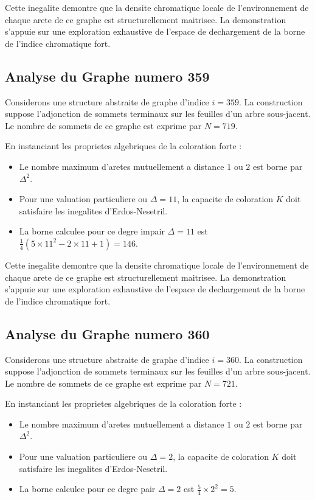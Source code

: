 \documentclass[11pt,a4paper]{article}
\begin{document}
Cette inegalite demontre que la densite chromatique locale de l'environnement de chaque arete de ce graphe est structurellement maitrisee. La demonstration s'appuie sur une exploration exhaustive de l'espace de dechargement de la borne de l'indice chromatique fort.

\subsection{Analyse du Graphe numero 359}
Considerons une structure abstraite de graphe d'indice $i = 359$. La construction suppose l'adjonction de sommets terminaux sur les feuilles d'un arbre sous-jacent. Le nombre de sommets de ce graphe est exprime par $N = 719$.

En instanciant les proprietes algebriques de la coloration forte :
\begin{itemize}
\item Le nombre maximum d'aretes mutuellement a distance $1$ ou $2$ est borne par $\Delta^2$.
\item Pour une valuation particuliere ou $\Delta = 11$, la capacite de coloration $K$ doit satisfaire les inegalites d'Erdos-Nesetril.
\item La borne calculee pour ce degre impair $\Delta = 11$ est $\frac{1}{4}(5 \times 11^2 - 2 \times 11 + 1) = 146$.
\end{itemize}

Cette inegalite demontre que la densite chromatique locale de l'environnement de chaque arete de ce graphe est structurellement maitrisee. La demonstration s'appuie sur une exploration exhaustive de l'espace de dechargement de la borne de l'indice chromatique fort.

\subsection{Analyse du Graphe numero 360}
Considerons une structure abstraite de graphe d'indice $i = 360$. La construction suppose l'adjonction de sommets terminaux sur les feuilles d'un arbre sous-jacent. Le nombre de sommets de ce graphe est exprime par $N = 721$.

En instanciant les proprietes algebriques de la coloration forte :
\begin{itemize}
\item Le nombre maximum d'aretes mutuellement a distance $1$ ou $2$ est borne par $\Delta^2$.
\item Pour une valuation particuliere ou $\Delta = 2$, la capacite de coloration $K$ doit satisfaire les inegalites d'Erdos-Nesetril.
\item La borne calculee pour ce degre pair $\Delta = 2$ est $\frac{5}{4} \times 2^2 = 5$.
\end{itemize}
\end{document}

